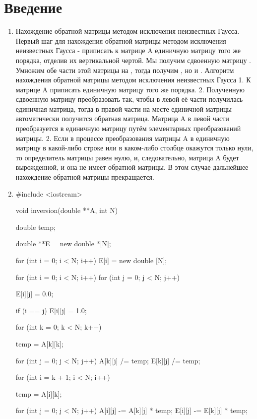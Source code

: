 \documentclass[12pt,a4paper]{scrartcl}
\begin{document}
\section{Введение}
\label{sec:intro}

\begin{enumerate}
 \item Нахождение обратной матрицы методом исключения неизвестных Гаусса. Первый шаг для нахождения обратной матрицы методом исключения неизвестных Гаусса - приписать к матрице A единичную матрицу того же порядка, отделив их вертикальной чертой. Мы получим сдвоенную матрицу  . Умножим обе части этой матрицы на  , тогда получим  , но   и  .
Алгоритм нахождения обратной матрицы методом исключения неизвестных Гаусса
1. К матрице A приписать единичную матрицу того же порядка.
2. Полученную сдвоенную матрицу преобразовать так, чтобы в левой её части получилась единичная матрица, тогда в правой части на месте единичной матрицы автоматически получится обратная матрица. Матрица A в левой части преобразуется в единичную матрицу путём элементарных преобразований матрицы.
2. Если в процессе преобразования матрицы A в единичную матрицу в какой-либо строке или в каком-либо столбце окажутся только нули, то определитель матрицы равен нулю, и, следовательно, матрица A будет вырожденной, и она не имеет обратной матрицы. В этом случае дальнейшее нахождение обратной матрицы прекращается.

 \item #include <iostream>
 
void inversion(double **A, int N)
{
    double temp;
 
    double **E = new double *[N];
 
    for (int i = 0; i < N; i++)
        E[i] = new double [N];
 
    for (int i = 0; i < N; i++)
        for (int j = 0; j < N; j++)
        {
            E[i][j] = 0.0;
 
            if (i == j)
                E[i][j] = 1.0;
        }
 
    for (int k = 0; k < N; k++)
    {
        temp = A[k][k];
 
        for (int j = 0; j < N; j++)
        {
            A[k][j] /= temp;
            E[k][j] /= temp;
        }
 
        for (int i = k + 1; i < N; i++)
        {
            temp = A[i][k];
 
            for (int j = 0; j < N; j++)
            {
                A[i][j] -= A[k][j] * temp;
                E[i][j] -= E[k][j] * temp;
            }
        }
    }
 
}
\end{enumerate}
\end{document}
